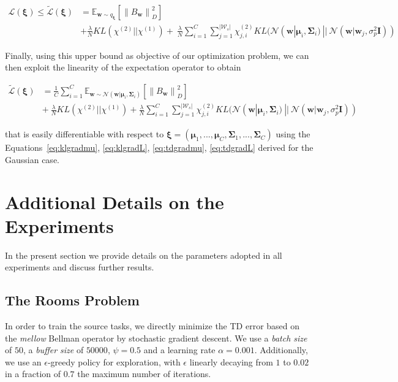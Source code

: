 \documentclass{article}
\newcommand{\norm}[1]{\left\lVert #1 \right\rVert}
\begin{document}
\begin{align}
\mathcal{L}(\bm{\xi}) \leq  \widetilde{\mathcal{L}}(\bm{\xi}) &= \mathbb{E}_{\bm{w} \sim q_{\bm{\xi}}}\left[\norm{B_{\bm{w}}}_D^2\right] \nonumber \\&+ \frac{\lambda}{N} KL(\chi^{(2)}||\chi^{(1)}) +\  \frac{\lambda}{N}\sum_{i=1}^C\sum_{j=1}^{|\mathcal{W}_s|} \chi_{j,i}^{(2)}KL(\mathcal{N}(\bm{w}|\bm{\mu}_i, \bm{\Sigma}_i)\ ||\ \mathcal{N}(\bm{w}|\bm{w}_j, \sigma_p^2\bm{I}))
\end{align}

Finally, using this upper bound as objective of our optimization problem, we can then exploit the linearity of the expectation operator to obtain


\begin{align}
\widetilde{\mathcal{L}}(\bm{\xi}) &= \frac{1}{C}\sum_{i=1}^C \mathbb{E}_{\bm{w} \sim \mathcal{N}(\bm{w}|\bm{\mu}_i, \bm{\Sigma}_i)}\left[\norm{B_{\bm{w}}}_D^2\right] \nonumber \\ &+\ \frac{\lambda}{N}KL(\chi^{(2)}||\chi^{(1)}) + \frac{\lambda}{N}\sum_{i=1}^C\sum_{j=1}^{|\mathcal{W}_s|} \chi_{j,i}^{(2)} KL(\mathcal{N}(\bm{w}|\bm{\mu}_i, \bm{\Sigma}_i)\ ||\ \mathcal{N}(\bm{w}|\bm{w}_j, \sigma_p^2\bm{I}))
\end{align}


that is easily differentiable with respect to $\bm{\xi} = (\bm{\mu}_1,..., \bm{\mu}_C, \bm{\Sigma}_1,..., \bm{\Sigma}_C)$ using the Equations~\eqref{eq:klgradmu}, \eqref{eq:klgradL}, \eqref{eq:tdgradmu}, \eqref{eq:tdgradL} derived for the Gaussian case.

\section{Additional Details on the Experiments}

In the present section we provide details on the parameters adopted in all experiments and discuss further results.

\subsection{The Rooms Problem}\label{app:c1}

In order to train the source tasks, we directly minimize the TD error based on the \textit{mellow} Bellman operator by stochastic gradient descent. We use a \textit{batch size} of $50$, a \textit{buffer size} of $50000$, $\psi=0.5$ and a learning rate $\alpha=0.001$. Additionally, we use an $\epsilon$-greedy policy for exploration, with $\epsilon$ linearly decaying from $1$ to $0.02$ in a fraction of $0.7$ the maximum number of iterations.
\end{document}
